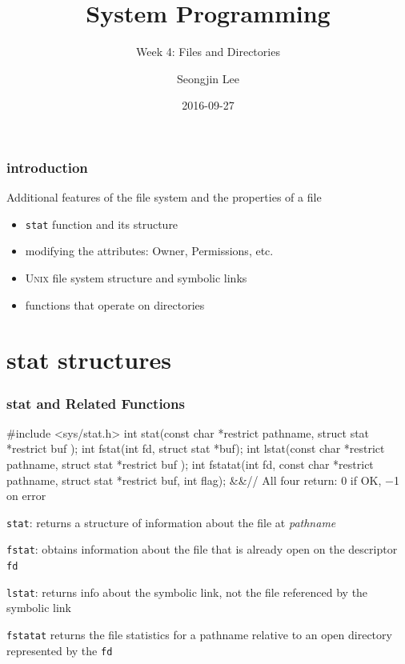 \documentclass[newPxFont,sthlmFooter,nooffset]{beamer}
\title{System Programming}
\subtitle{Week 4: Files and Directories}
\author[SJL]{Seongjin Lee}
\institute{\href{mailto:insight@hanyang.ac.kr}{insight@hanyang.ac.kr}\\\url{http://esos.hanyang.ac.kr}\\Esos Lab. Hanyang University}
\date{2016-09-27}
\begin{document}
\frame[plain]{\titlepage} 




\begin{frame}[t]
  \frametitle{introduction}
Additional features of the file system and the properties of a file
\begin{itemize}
\item \texttt{stat} function and its structure
\item modifying the attributes: Owner, Permissions, etc.
\item \textsc{Unix} file system structure and symbolic links
\item functions that operate on directories
\end{itemize}
\end{frame}

\section{stat structures}

\begin{frame}[containsverbatim,t]
  \frametitle{stat and Related Functions}
\begin{codedef}
#include <sys/stat.h>
int stat(const char *restrict pathname, struct stat *restrict buf );
int fstat(int fd, struct stat *buf);
int lstat(const char *restrict pathname, struct stat *restrict buf );
int fstatat(int fd, const char *restrict pathname, struct stat *restrict buf, int flag);
&&\hfill // All four return: 0 if OK, −1 on error 
\end{codedef}

\texttt{stat}: returns a structure of information about the file at \textit{pathname}

\texttt{fstat}: obtains information about the file that is already open on the descriptor \texttt{fd}

\texttt{lstat}: returns info about the symbolic link, not the file referenced by the symbolic link

\texttt{fstatat} returns the file statistics for a pathname relative to an open directory represented by the \texttt{fd}

\end{frame}
\end{document}
